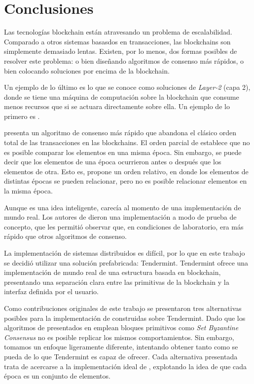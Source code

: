 %
\section{Conclusiones}
Las tecnologías blockchain están atravesando un problema de escalabilidad.
%
Comparado a otros sistemas basasdos en transacciones, las blockchains son simplemente
demasiado lentas.
%
Existen, por lo menos, dos formas posibles de resolver este problema: o bien
diseñando algoritmos de consenso más rápidos, o bien colocando soluciones por
encima de la blockchain.

%
Un ejemplo de lo último es lo que se conoce como soluciones de \emph{Layer-2}
(capa 2),
donde se tiene una máquina de computación sobre la blockchain que consume menos
recursos que si se actuara directamente sobre ella.
%
Un ejemplo de lo primero es \setchain.

\setchain presenta un algoritmo de consenso más rápido
que abandona el clásico orden total de las transacciones en las blockchains.
%
El orden parcial de \setchain establece que no es posible comparar los elementos
en una misma época.
%
Sin embargo, se puede decir que los elementos de una época ocurrieron antes o después
que los elementos de otra.
%
Esto es, \setchain propone un orden relativo, en donde los elementos
de distintas épocas se pueden relacionar, pero no es posible relacionar elementos
en la misma época.

Aunque \setchain es una idea inteligente, carecía al momento de una implementación
de mundo real.
%
Los autores de \setchain dieron una implementación a modo de prueba de concepto,
que les permitió observar que, en condiciones de laboratorio,
era más rápido que otros algoritmos de consenso.
%

La implementación de sistemas distribuidos es difícil, por lo que en este trabajo
se decidió utilizar una solución prefabricada: Tendermint.
Tendermint ofrece una implementación
de mundo real de una estructura basada en blockchain, presentando una separación clara
entre las primitivas de la blockchain y la interfaz definida por el usuario.


Como contribuciones originales de este trabajo se presentaron tres alternativas posibles para la implementación
de \setchain construidas sobre Tendermint. Dado que los algoritmos de \setchain
presentados en \cite{Capretto.2022.Setchain} emplean bloques primitivos como
\emph{Set Byzantine Consensus}
no es posible replicar los mismos comportamientos.
Sin embargo, tomamos un enfoque ligeramente diferente,
intentando obtener tanto como se pueda de lo que Tendermint es capaz de ofrecer.
Cada alternativa presentada trata de acercarse a la implementación ideal de \setchain,
explotando la idea de que cada época es un conjunto de elementos.

